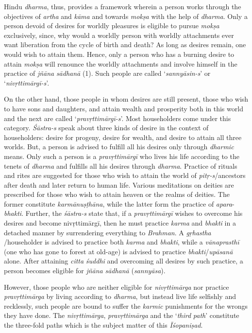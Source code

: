 Hindu \emph{dharma}, thus, provides a framework wherein a person works through the objectives of \emph{artha} and \emph{kāma} and towards \emph{mokṣa} with the help of \emph{dharma}. Only a person devoid of desires for worldly pleasures is eligible to pursue \emph{mokṣa} exclusively, since, why would a worldly person with worldly attachments ever want liberation from the cycle of birth and death? As long as desires remain, one would wish to attain them. Hence, only a person who has a burning desire to attain \emph{mokṣa} will renounce the worldly attachments and involve himself in the practice of \emph{jñāna} \emph{sādhanā} (1). Such people are called `\emph{sannyāsin-s}' or `\emph{nivṛttimārgī-s}'.

On the other hand, those people in whom desires are still present, those who wish to have sons and daughters, and attain wealth and prosperity both in this world and the next are called `\emph{pravṛttimārgī-s}'. Most householders come under this category. \emph{Śāstra-s} speak about three kinds of desire in the context of householders: desire for progeny, desire for wealth, and desire to attain all three worlds. But, a person is advised to fulfill all his desires only through \emph{dharmic} means. Only such a person is a \emph{pravṛttimārgī} who lives his life according to the tenets of \emph{dharma} and fulfills all his desires through \emph{dharma}. Practice of rituals and rites are suggested for those who wish to attain the world of \emph{pitṛ-s}/ancestors after death and later return to human life. Various meditations on deities are prescribed for those who wish to attain heaven or the realms of deities. The former constitute \emph{karmānuṣṭhāna}, while the latter form the practice of \emph{apara}-\emph{bhakti}. Further, the \emph{śāstra-s} state that, if a \emph{pravṛttimārgī} wishes to overcome his desires and become nivṛttimārgī, then he must practice \emph{karma} and \emph{bhakti} in a detached manner by surrendering everything to \emph{Brahman}. A \emph{gṛhastha} /householder is advised to practice both \emph{karma} and \emph{bhakti}, while a \emph{vānaprasthī} (one who has gone to forest at old-age) is advised to practice \emph{bhakti}/\emph{upāsanā} alone. After attaining \emph{citta} \emph{śuddhi} and overcoming all desires by such practice, a person becomes eligible for \emph{jñāna} \emph{sādhanā} (\emph{sannyāsa}).

However, those people who are neither eligible for \emph{nivṛttimārga} nor practice \emph{pravṛttimārga} by living according to \emph{dharma}, but instead live life selfishly and recklessly, such people are bound to suffer the \emph{karmic} punishments for the wrongs they have done. The \emph{nivṛttimārga}, \emph{pravṛttimārga} and the `\emph{third} \emph{path}' constitute the three-fold paths which is the subject matter of this \emph{Īśopaniṣad}.

